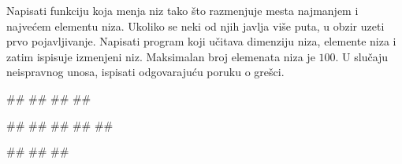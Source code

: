 \begin{Exercise}[label=p.razmena_min_max]
  Napisati funkciju koja menja niz tako što razmenjuje mesta najmanjem i najvećem elementu niza.
  Ukoliko se neki od njih javlja više puta, u obzir uzeti prvo pojavljivanje.
  Napisati program koji učitava dimenziju niza, elemente niza i zatim ispisuje
  izmenjeni niz. 
  Maksimalan broj elemenata niza je $100$. 
  U slučaju neispravnog unosa, ispisati odgovarajuću poruku o grešci. 

\begin{miditest}
\begin{upotreba}{1}
#\naslovInt#
##
##
##
\end{upotreba}
\end{miditest}
\begin{miditest}
\begin{upotreba}{2}
#\naslovInt#
##
##
##
##
\end{upotreba}
\end{miditest}

\begin{miditest}
\begin{upotreba}{3}
#\naslovInt#
##
##
\end{upotreba}
\end{miditest}
\end{Exercise}

\ifresenja
\begin{Answer}[ref=p.razmena_min_max]
\end{Answer}
\fi


